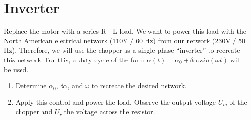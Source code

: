 \section{Inverter}

Replace the motor with a series R - L load. We want to power this load with the North American electrical network (110V / 60 Hz) from our network (230V / 50 Hz). Therefore, we will use the chopper as a single-phase ``inverter'' to recreate this network. For this, a duty cycle of the form $\alpha(t) = \alpha_0 + \delta\alpha. sin(\omega t)$ will be used.
\begin{enumerate}
\item Determine $\alpha_0$, $\delta\alpha$, and $\omega$ to recreate the desired network.

\item Apply this control and power the load. Observe the output voltage $U_m$ of the chopper and $U_r$ the voltage across the resistor.
\end{enumerate}